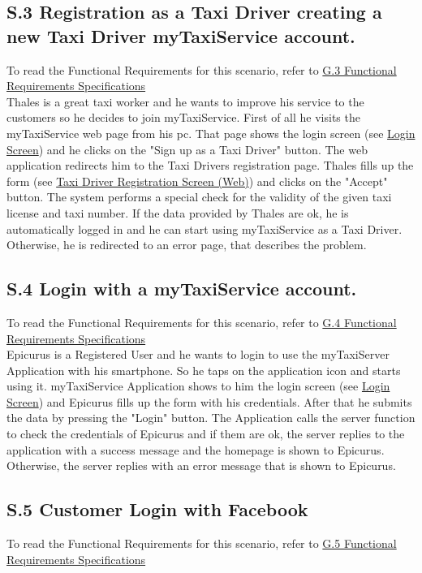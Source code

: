 		\subsection{S.3 Registration as a Taxi Driver creating a new Taxi Driver myTaxiService account.}\label{sec:TaxiDriverRegistrationScenario}
		To read the Functional Requirements for this scenario, refer to \hyperref[sec:frs3]{G.3 Functional Requirements Specifications}\\

		Thales is a great taxi worker and he wants to improve his service to the customers so he decides to join myTaxiService.
		First of all he visits the myTaxiService web page from his pc. That page shows the login screen (see \hyperref[login_m]{Login Screen}) and he clicks on the "Sign up as a Taxi Driver" button. The web application redirects him to the Taxi Drivers registration page. Thales fills up the form (see \hyperref[tregistration_w]{Taxi Driver Registration Screen (Web)}) and clicks on the "Accept" button. The system performs a special check for the validity of the given taxi license and taxi number. If the data provided by Thales are ok, he is automatically logged in and he can start using myTaxiService as a Taxi Driver. Otherwise, he is redirected to an error page, that describes the problem.

		\subsection{S.4 Login with a myTaxiService account.}\label{sec:RegisteredUserLoginScenario}
		To read the Functional Requirements for this scenario, refer to \hyperref[sec:frs4]{G.4 Functional Requirements Specifications}\\

		Epicurus is a Registered User and he wants to login to use the myTaxiServer Application with his smartphone. So he taps on the application icon and starts using it. myTaxiService Application shows to him the login screen (see \hyperref[login_m]{Login Screen}) and Epicurus fills up the form with his credentials. After that he submits the data by pressing the "Login" button. The Application calls the server function to check the credentials of Epicurus and if them are ok, the server replies to the application with a success message and the homepage is shown to Epicurus. Otherwise, the server replies with an error message that is shown to Epicurus.

		\subsection{S.5 Customer Login with Facebook}
		To read the Functional Requirements for this scenario, refer to \hyperref[sec:frs5]{G.5 Functional Requirements Specifications}\\


